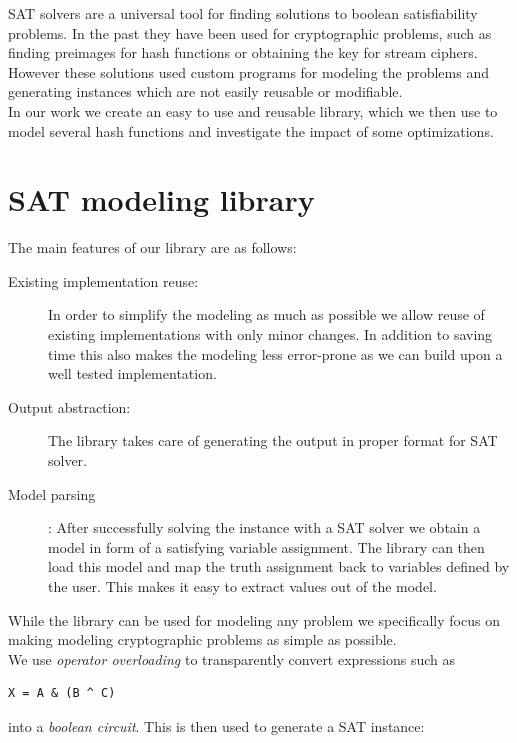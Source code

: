 \documentclass[myposter,portrait]{sciposter}
\def\mysection#1{
{\color{sectionCol}\section*{\sc\bfseries #1}}}
\begin{document}
\begin{multicols*}{3}
SAT solvers are a universal tool for finding solutions to boolean satisfiability problems.
In the past they have been used for cryptographic problems, such as finding preimages for hash functions or obtaining the key for stream ciphers.
However these solutions used custom programs for modeling the problems and generating instances which are not easily reusable or modifiable.
~\\

In our work we create an easy to use and reusable library, which we then use to model several hash functions and investigate the impact of some optimizations.

\mysection{SAT modeling library}
The main features of our library are as follows:

\begin{description}
\item[Existing implementation reuse:] In order to simplify the modeling as much as possible we allow reuse of existing implementations with only minor changes.
In addition to saving time this also makes the modeling less error-prone as we can build upon a well tested implementation.

\item[Output abstraction:] The library takes care of generating the output in proper format for SAT solver.

\item[Model parsing]: After successfully solving the instance with a SAT solver we obtain a model in form of a satisfying variable assignment.
The library can then load this model and map the truth assignment back to variables defined by the user.
This makes it easy to extract values out of the model.
\end{description}

While the library can be used for modeling any problem we specifically focus on making modeling cryptographic problems as simple as possible.
~\\


We use \emph{operator overloading} to transparently convert expressions such as
\begin{center}
\begin{BVerbatim}
X = A & (B ^ C)
\end{BVerbatim}
\end{center}
into a \emph{boolean circuit}.
This is then used to generate a SAT instance:


\end{multicols*}
\end{document}
